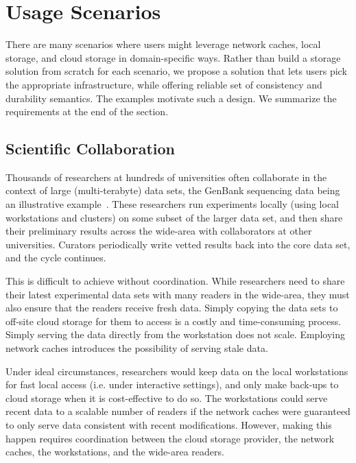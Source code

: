 \section{Usage Scenarios}
\label{sec:motivation}

There are many scenarios where users might leverage network caches, local storage, and cloud storage in domain-specific ways.  Rather than build a storage solution from scratch for each scenario, we propose a solution that lets users pick the appropriate infrastructure, while offering reliable set of consistency and durability semantics. The examples motivate such a design. We summarize the requirements at the end of the section.


\subsection{Scientific Collaboration}

Thousands of researchers at hundreds of universities often collaborate in the context of large (multi-terabyte) data sets, the GenBank sequencing data being an illustrative example~\cite{GenBank}. These researchers run experiments locally (using local workstations and clusters) on some subset of the larger data set, and then share their preliminary results across the wide-area with collaborators at other universities.  Curators periodically write vetted results back into the core data set, and the cycle continues.

This is difficult to achieve without coordination.  While researchers need to share their latest experimental data sets with many readers in the wide-area, they must also ensure that the readers receive fresh data.  Simply copying the data sets to off-site cloud storage for them to access is a costly and time-consuming process.  Simply serving the data directly from the workstation does not scale.  Employing network caches introduces the possibility of serving stale data.

Under ideal circumstances, researchers would keep data on the local workstations for fast local access (i.e. under interactive settings), and only make back-ups to cloud storage when it is cost-effective to do so.  The workstations could serve recent data to a scalable number of readers if the network caches were guaranteed to only serve data consistent with recent modifications.  However, making this happen requires coordination between the cloud storage provider, the network caches, the workstations, and the wide-area readers.

